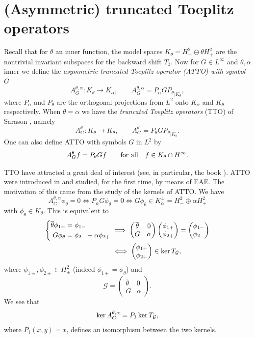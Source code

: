 \documentclass[11pt]{article}
\def\G{\mathcal G}
\def\beq{\begin{equation}}
\def\eeq{\end{equation}}
\def\ol{\overline}
\def\ker{\mathop{\rm ker}\nolimits}
\begin{document}
\section{(Asymmetric) truncated Toeplitz operators}
\label{sec:3}

Recall that for $\theta$ an inner function, the model spaces $K_\theta =H^2_+ \ominus \theta H^2_+$  are the nontrivial invariant subspaces for the
backward shift $T_{\ol z}$.
Now for $G \in L^\infty$ and $\theta, \alpha$ inner we define the {\em asymmetric
truncated Toeplitz operator  (ATTO) with symbol $G$}
\[
A^{\theta,\alpha}_G: K_\theta \to K_\alpha, \qquad A^{\theta,\alpha}_G = P_\alpha G {P_\theta}_{|K_\theta},
\]
where $P_\alpha$ and $P_\theta$ are the orthogonal projections from $L^2$ onto
$K_\alpha$ and $K_\theta$ respectively. 
When $\theta=\alpha$ we have the {\em truncated Toeplitz operators\/} (TTO)
of Sarason \cite{sarason07}, namely
\[
A^\theta_G: K_\theta \to K_\theta, \qquad A^\theta_G=P_\theta G {P_\theta}_{|K_\theta}.
\]
One can also define ATTO with symbols $G$ in $L^2$ by
\[
A^\theta_G f = P_\theta Gf \qquad \hbox{for all} \quad f \in K_\theta \cap H^\infty.
\]



TTO have attracted a great deal of interest (see, in particular, the book \cite{GMR16}).
ATTO were introduced in
\cite{CP17} and studied, for the first time, by means of EAE. The
motivation of this came from the study of the kernels of ATTO. We have
\beq\label{eq:27}
A^{\theta,\alpha}_G \phi_\theta =0 \iff P_\alpha G \phi_\theta= 0 \iff G\phi_\theta \in K_\alpha^\perp = H^2_- \oplus \alpha H^2_+
\eeq 
with $\phi_\theta \in K_\theta$. This is equivalent to
\begin{align}\label{eq:28}
\left\{
\begin{aligned}
\ol\theta \phi_{1+} &= \phi_{1-}  \\
G \phi_\theta &= \phi_{2-} - \alpha \phi_{2+} 
\end{aligned} \right.
& \implies
\begin{pmatrix}
\ol\theta & 0 \\ G & \alpha \end{pmatrix}
\begin{pmatrix} \phi_{1+} \\ \phi_{2+} \end{pmatrix} =
 \begin{pmatrix}
 \phi_{1-} \\ \phi_{2-} \end{pmatrix} \nonumber \\
 & \iff 
\begin{pmatrix} \phi_{1+} \\ \phi_{2+} \end{pmatrix} \in \ker T_\G,
\end{align}
where $\phi_{1 \pm},\phi_{2\pm} \in H^2_{\pm}$ (indeed $\phi_{1+}=\phi_\theta$) and
\beq\label{eq:29}
\G = \begin{pmatrix}
\ol\theta & 0 \\ G & \alpha \end{pmatrix}.
\eeq
We see that
\beq\label{eq:12ajun23}
\ker A^{\theta,\alpha}_G = P_1 \ker T_\G,
\eeq
where $P_1(x,y)=x$, defines an isomorphism between the two kernels.
\end{document}
